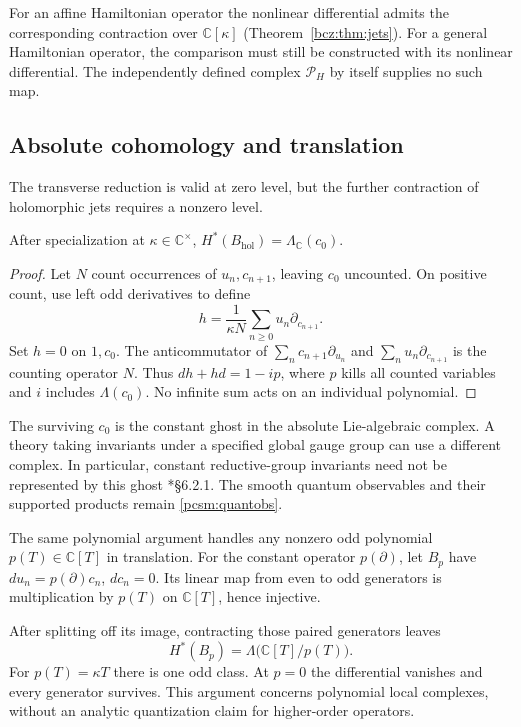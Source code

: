 For an affine Hamiltonian operator the nonlinear differential admits
the corresponding contraction over \(\mathbb C[\kappa]\)
(Theorem~\ref{bcz:thm:jets}).
For a general Hamiltonian operator, the comparison must still be
constructed with its nonlinear differential. The independently
defined complex \(\mathcal P_H\) by itself supplies no such map.

\subsection{Absolute cohomology and translation}

The transverse reduction is valid at zero level, but the further
contraction of holomorphic jets requires a nonzero level.

\begin{proposition}\label{pcsm:localcohom}
After specialization at \(\kappa\in\mathbb C^\times\),
\(H^*(B_{\mathrm{hol}})=\Lambda_{\mathbb C}(c_0)\).
\end{proposition}

\begin{proof}
Let \(N\) count occurrences of \(u_n,c_{n+1}\), leaving \(c_0\)
uncounted. On positive count, use left odd derivatives to define
\[
 h=\frac1{\kappa N}\sum_{n\geq0}u_n\partial_{c_{n+1}}.
\]
Set \(h=0\) on \(1,c_0\).
The anticommutator of
\(\sum_n c_{n+1}\partial_{u_n}\) and
\(\sum_n u_n\partial_{c_{n+1}}\) is the counting operator \(N\).
Thus \(dh+hd=1-ip\), where \(p\) kills all counted variables
and \(i\) includes \(\Lambda(c_0)\).
No infinite sum acts on an individual polynomial.
\end{proof}

The surviving \(c_0\) is the constant ghost in the absolute
Lie-algebraic complex. A theory taking invariants under a specified
global gauge group can use a different complex. In particular,
constant reductive-group invariants need not be represented by this
ghost \cite{pcsm:CDG}*{\S6.2.1}.
The smooth quantum observables and their supported products remain
\eqref{pcsm:quantobs}.

The\label{pcsm:def:constant-operator-complex} same polynomial argument handles any nonzero odd polynomial
\(p(T)\in\mathbb C[T]\) in translation.
For the constant operator \(p(\partial)\), let \(B_p\) have
\(du_n=p(\partial)c_n\), \(dc_n=0\).
Its linear map from even to odd generators is multiplication by
\(p(T)\) on \(\mathbb C[T]\), hence injective.

After splitting off its image, contracting those paired generators leaves
\[
 H^*(B_p)=\Lambda\bigl(\mathbb C[T]/p(T)\bigr).
\]
For \(p(T)=\kappa T\) there is one odd class.
At \(p=0\) the differential vanishes and every generator survives.
This argument concerns polynomial local complexes, without an analytic
quantization claim for higher-order operators.

